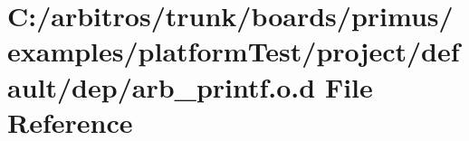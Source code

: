 \hypertarget{platform_test_2project_2default_2dep_2arb__printf_8o_8d}{\section{C\-:/arbitros/trunk/boards/primus/examples/platform\-Test/project/default/dep/arb\-\_\-printf.o.\-d File Reference}
\label{platform_test_2project_2default_2dep_2arb__printf_8o_8d}
}
